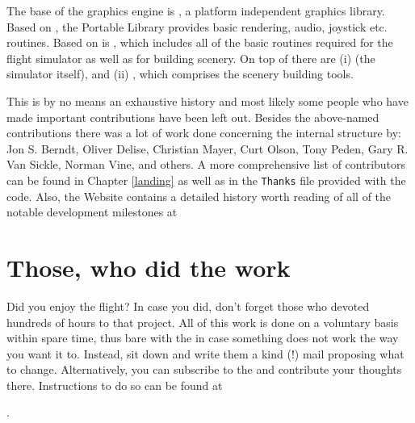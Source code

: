 The base of the graphics engine is \textbf{}, a platform independent
graphics library. Based on , the Portable Library \PLIB{}
provides basic rendering, audio, joystick etc. routines. Based on \PLIB{} is
\SimGear{}, which includes all of the basic routines required for the
flight simulator as well as for building scenery. On top of \SimGear{}
there are (i) \FlightGear{} (the simulator itself), and (ii)
\TerraGear{}, which comprises the scenery building tools.

This is by no means an exhaustive history and most likely some people who have made
important contributions have been left out. Besides the above-named contributions there
was a lot of work done concerning the internal structure by: Jon S. Berndt, Oliver Delise,  Christian Mayer, 
Curt Olson, Tony Peden,  Gary R. Van
Sickle, Norman Vine, and others. A more
comprehensive list of contributors can be found in Chapter \ref{landing} as well as in
the \texttt{Thanks} file provided with the code. Also, the \FlightGear{}
Website contains a detailed history worth reading of all of the
notable development milestones at
 \medskip


\section{Those, who did the work}

Did you enjoy the flight? In case you did, don't forget those who devoted hundreds of
hours to that project. All of this work is done on a voluntary basis within spare time,
thus bare with the  in case something does not work the way you want
it to. Instead, sit down and write them a kind (!) mail proposing what to change.
Alternatively, you can subscribe to the \FlightGear{}  and
contribute your thoughts there. Instructions to do so can be found at
 \medskip

 .
  \medskip

